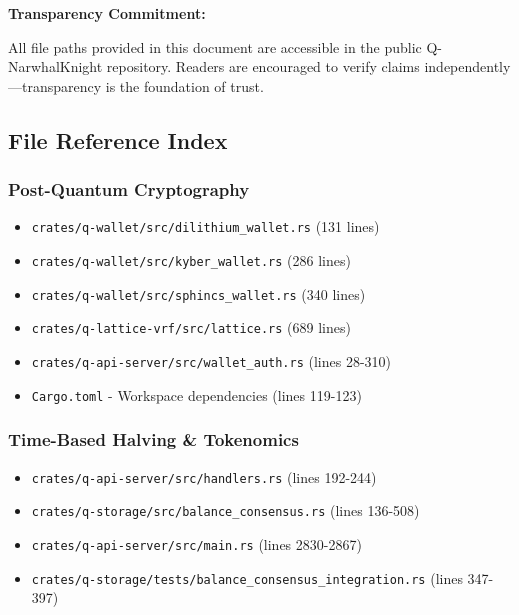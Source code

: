 \documentclass[11pt,a4paper]{article}
\begin{document}
\textbf{Transparency Commitment:}

All file paths provided in this document are accessible in the public Q-NarwhalKnight repository. Readers are encouraged to verify claims independently—transparency is the foundation of trust.

\subsection{File Reference Index}

\subsubsection{Post-Quantum Cryptography}
\begin{itemize}[leftmargin=*]
\item \texttt{crates/q-wallet/src/dilithium\_wallet.rs} (131 lines)
\item \texttt{crates/q-wallet/src/kyber\_wallet.rs} (286 lines)
\item \texttt{crates/q-wallet/src/sphincs\_wallet.rs} (340 lines)
\item \texttt{crates/q-lattice-vrf/src/lattice.rs} (689 lines)
\item \texttt{crates/q-api-server/src/wallet\_auth.rs} (lines 28-310)
\item \texttt{Cargo.toml} - Workspace dependencies (lines 119-123)
\end{itemize}

\subsubsection{Time-Based Halving \& Tokenomics}
\begin{itemize}[leftmargin=*]
\item \texttt{crates/q-api-server/src/handlers.rs} (lines 192-244)
\item \texttt{crates/q-storage/src/balance\_consensus.rs} (lines 136-508)
\item \texttt{crates/q-api-server/src/main.rs} (lines 2830-2867)
\item \texttt{crates/q-storage/tests/balance\_consensus\_integration.rs} (lines 347-397)
\end{itemize}
\end{document}
